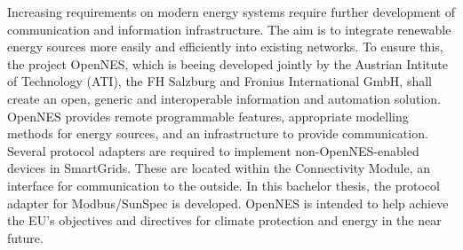 Increasing requirements on modern energy systems require  further development of  communication and information infrastructure. The aim is to integrate renewable energy sources more easily and efficiently into existing networks. 
To ensure this, the project OpenNES, which is beeing developed jointly by the Austrian Intitute of Technology (ATI), the FH Salzburg and Fronius International GmbH, shall  create an open, generic and interoperable information and automation solution. 
OpenNES provides remote programmable features, appropriate modelling methods for energy sources, and an infrastructure to provide communication. 
Several protocol adapters are required to implement non-OpenNES-enabled devices in SmartGrids. These are located within the Connectivity Module, an interface for communication to the outside. 
In this bachelor thesis, the protocol adapter for Modbus/SunSpec is developed. 
OpenNES is intended to help achieve the EU's objectives and directives for climate protection and energy in the near future. 
